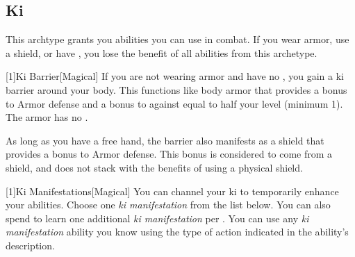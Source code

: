     \subsection{Ki}
        This archtype grants you abilities you can use in combat.
        If you wear armor, use a shield, or have , you lose the benefit of all abilities from this archetype.

        [1]{Ki Barrier}[Magical]
        If you are not wearing armor and have no , you gain a ki barrier around your body.
        This functions like body armor that provides a  bonus to Armor defense and a bonus to  against  equal to half your level (minimum 1).
        The armor has no .

        As long as you have a free hand, the barrier also manifests as a shield that provides a  bonus to Armor defense.
        This bonus is considered to come from a shield, and does not stack with the benefits of using a physical shield.

        [1]{Ki Manifestations}[Magical]
        You can channel your ki to temporarily enhance your abilities.
        Choose one \textit{ki manifestation} from the list below.
        You can also spend  to learn one additional \textit{ki manifestation} per .
        You can use any \textit{ki manifestation} ability you know using the type of action indicated in the ability's description.

